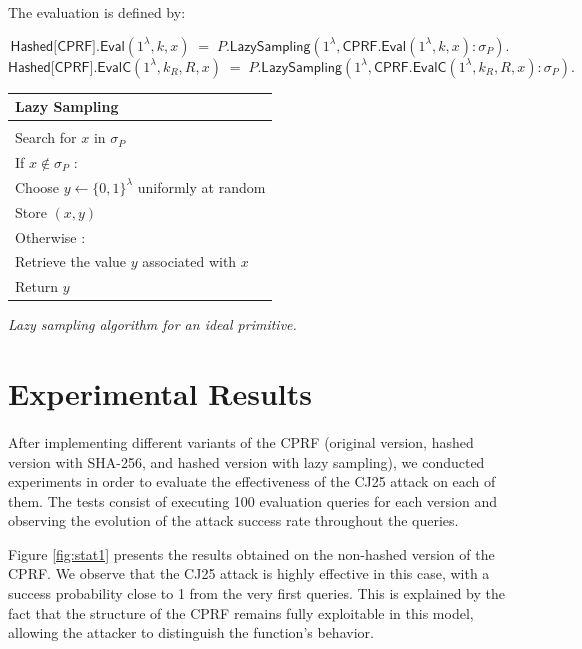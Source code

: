 \documentclass[9pt]{extarticle}
\begin{document}
The evaluation is defined by:

\[
\textsf{Hashed[CPRF].Eval}(1^\lambda, k, x)
\;=\;
\textsf{$P$.LazySampling}(1^\lambda, \textsf{CPRF.Eval}(1^\lambda, k, x) : \sigma_P).
\]
\[
\textsf{Hashed[CPRF].EvalC}(1^\lambda, k_R, R, x)
\;=\;
\textsf{$P$.LazySampling}(1^\lambda, \textsf{CPRF.EvalC}(1^\lambda, k_R, R, x) : \sigma_P).
\]


\begin{center}
  \begin{tabular}{l}
    \textbf{Lazy Sampling} \\
    \hline \\
    Search for $x$ in $\sigma_P$ \\
    If $x \notin \sigma_P$ : \\
    \quad Choose $y \leftarrow \{0,1\}^\lambda$ uniformly at random \\
    \quad Store $(x,y)$ \\
    Otherwise : \\
    \quad Retrieve the value $y$ associated with $x$ \\
    Return $y$
  \end{tabular}
  
  \vspace{1ex}
  \textit{Lazy sampling algorithm for an ideal primitive.}
\end{center}



\section{Experimental Results}

\paragraph{}After implementing different variants of the CPRF (original version, hashed version with SHA-256, and hashed version with lazy sampling), 
we conducted experiments in order to evaluate the effectiveness of the CJ25 attack on each of them. 
The tests consist of executing 100 evaluation queries for each version and observing the evolution of the attack success rate throughout the queries.

Figure \ref{fig:stat1} presents the results obtained on the non-hashed version of the CPRF. 
We observe that the CJ25 attack is highly effective in this case, with a success probability close to 1 from the very first queries. 
This is explained by the fact that the structure of the CPRF remains fully exploitable in this model, allowing the attacker to distinguish the function's behavior.
\end{document}
